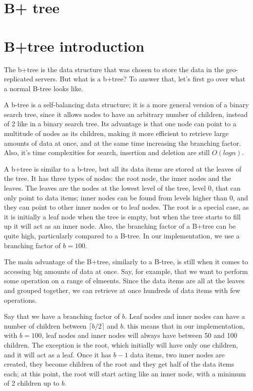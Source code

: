 \section{B+ tree}\label{sec:B+tree}

\section{B+tree introduction}\label{sec:b+tree-introduction}
The b+tree is the data structure that was chosen to store the data in the geo-replicated servers. 
But what is a b+tree? To answer that, let's first go over what a normal B-tree looks like. 


A b-tree is a self-balancing data structure; it is a more general version of a binary search tree, since it allows nodes to have an arbitrary number of children, instead of 2 like in a binary search tree. Its advantage is that one node can point to a multitude of nodes as its children, making it more efficient to retrieve large amounts of data at once, and at the same time increasing the branching factor. Also, it's time complexities for search, insertion and deletion are still $O(log n)$.

A b+tree is similar to a b-tree, but all its data items are stored at the leaves of the tree. It has three types of nodes: the root node, the inner nodes and the leaves. The leaves are the nodes at the lowest level of the tree, level 0, that can only point to data items; inner nodes can be found from levels higher than 0, and they can point to other inner nodes or to leaf nodes. The root is a special case, as it is initially a leaf node when the tree is empty, but when the tree starts to fill up it will act as an inner node. Also, the branching factor of a B+tree can be quite high, particularly compared to a B-tree. In our implementation, we use a branching factor of $b=100$.

The main advantage of the B+tree, similarly to a B-tree, is still when it comes to accessing big amounts of data at once. Say, for example, that we want to perform some operation on a range of elmeents. Since the data items are all at the leaves and grouped together, we can retrieve at once hundreds of data items with few operations. 

Say that we have a branching factor of $b$. Leaf nodes and inner nodes can have a number of children between $\lceil b/2 \rceil$ and $b$. this means that in our implementation, with $b=100$, leaf nodes and inner nodes will always have between 50 and 100 children. The exception is the root, which initially will have only one children, and it will act as a leaf. Once it has $b-1$ data items, two inner nodes are created, they become children of the root and they get half of the data items each; at this point, the root will start acting like an inner node, with a minimum of 2 children up to $b$.

